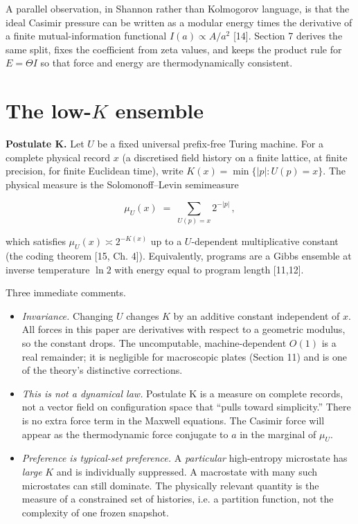 \documentclass[11pt,letterpaper]{article}
\begin{document}
A parallel observation, in Shannon rather than Kolmogorov language, is that the ideal Casimir pressure can be written as a modular energy times the derivative of a finite mutual-information functional \(I(a)\propto A/a^{2}\) [14]. Section 7 derives the same split, fixes the coefficient from zeta values, and keeps the product rule for \(E=\Theta I\) so that force and energy are thermodynamically consistent.



\section{\texorpdfstring{The low-\(K\) ensemble}{The low-K ensemble}}


\textbf{Postulate K.} Let \(U\) be a fixed universal prefix-free Turing machine. For a complete physical record \(x\) (a discretised field history on a finite lattice, at finite precision, for finite Euclidean time), write \(K(x)=\min\{\lvert p\rvert:U(p)=x\}\). The physical measure is the Solomonoff–Levin semimeasure


\[
\mu_U(x)\;=\;\sum_{U(p)=x}2^{-\lvert p\rvert}\,,
\tag{2}
\]


which satisfies \(\mu_U(x)\asymp 2^{-K(x)}\) up to a \(U\)-dependent multiplicative constant (the coding theorem [15, Ch. 4]). Equivalently, programs are a Gibbs ensemble at inverse temperature \(\ln 2\) with energy equal to program length [11,12].


Three immediate comments.


\begin{itemize}
\item \emph{Invariance.} Changing \(U\) changes \(K\) by an additive constant independent of \(x\). All forces in this paper are derivatives with respect to a geometric modulus, so the constant drops. The uncomputable, machine-dependent \(O(1)\) is a real remainder; it is negligible for macroscopic plates (Section 11) and is one of the theory’s distinctive corrections.
\item \emph{This is not a dynamical law.} Postulate K is a measure on complete records, not a vector field on configuration space that “pulls toward simplicity.” There is no extra force term in the Maxwell equations. The Casimir force will appear as the thermodynamic force conjugate to \(a\) in the marginal of \(\mu_U\).
\item \emph{Preference is typical-set preference.} A \emph{particular} high-entropy microstate has \emph{large} \(K\) and is individually suppressed. A macrostate with many such microstates can still dominate. The physically relevant quantity is the measure of a constrained set of histories, i.e. a partition function, not the complexity of one frozen snapshot.
\end{itemize}
\end{document}
